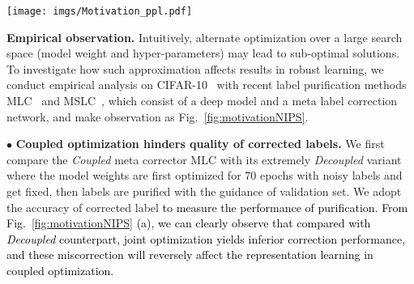 \documentclass[10pt,twocolumn,letterpaper]{article}
\newcommand{\zbs}[1]{\textcolor{black}{#1}}
\newcommand{\lyx}[1]{\textcolor{black}{#1}}
\newcommand{\zbsN}[1]{\textcolor{black}{#1}}
\begin{document}
\begin{figure*}[!t]
\centering
\texttt{[image: imgs/Motivation\_ppl.pdf]}
\vspace{-1em}
\caption
    {
    \small
        \zbsN{The corrected label accuracy (a) and linear probe accuracy of representations (b) between coupled~\cite{zheng2021meta} and decoupled label correction schemes during training under 50\% and 90\% symmetric label noise on CIFAR-10. \zbs{(c) investigates the effect of representation
        learning on `Ori'-original coupled network training from scratch, `SimCLR-Coupled'-initialization with stronger self-supervised pretrained weights and `SimCLR-Decoupled'-further fix the pretrained backbone during label purification.}
        }  
} 
  \label{fig:motivationNIPS}

\end{figure*}







{\textbf{Empirical observation.} Intuitively, alternate optimization over a large search space (model weight and hyper-parameters) may lead to sub-optimal solutions. To investigate how such approximation affects results in robust learning, we conduct empirical analysis on CIFAR-10~\cite{datasetcifar10} with recent label purification methods MLC~\cite{zheng2021meta} and MSLC~\cite{AAAI-2021-meta}, which consist of a deep model and a meta label correction network, and make observation as Fig.~\ref{fig:motivationNIPS}.}

\noindent $\bullet$ \textbf{Coupled optimization hinders quality of corrected labels.} We first compare the \emph{Coupled} meta corrector MLC with its extremely \emph{Decoupled} variant where the model weights are first optimized for $70$ epochs with noisy labels and get fixed, then labels are purified with the guidance of validation set. We adopt the accuracy of corrected label \lyx{to measure the performance of purification.} \zbsN{From Fig.~\ref{fig:motivationNIPS} (a), we can clearly observe that compared with \emph{Decoupled} counterpart, joint optimization yields inferior correction performance, and these miscorrection will reversely affect the representation learning in coupled optimization.}
\end{document}
